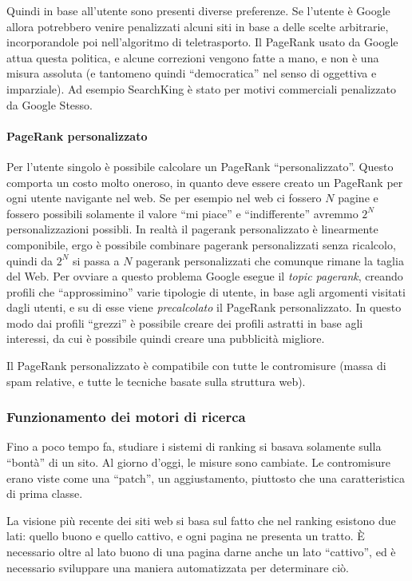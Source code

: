 Quindi in base all'utente sono presenti diverse preferenze. Se l'utente \`e Google allora potrebbero venire penalizzati alcuni siti in base a delle scelte arbitrarie, incorporandole poi nell'algoritmo di teletrasporto. Il PageRank usato da Google attua questa politica, e alcune correzioni vengono fatte a mano, e non \`e una misura assoluta (e tantomeno quindi ``democratica'' nel senso di oggettiva e imparziale). Ad esempio SearchKing \`e stato per motivi commerciali penalizzato da Google Stesso.

\paragraph*{PageRank personalizzato}Per l'utente singolo \`e possibile calcolare un PageRank ``personalizzato''. Questo comporta un costo molto oneroso, in quanto deve essere creato un PageRank per ogni utente navigante nel web. Se per esempio nel web ci fossero $N$ pagine e fossero possibili solamente il valore ``mi piace'' e ``indifferente'' avremmo $2^N $ personalizzazioni possibli. In realt\`a il pagerank personalizzato \`e linearmente componibile, ergo \`e possibile combinare pagerank personalizzati senza ricalcolo, quindi da $2^N $ si passa a $N$ pagerank personalizzati che comunque rimane la taglia del Web. Per ovviare a questo problema Google esegue il \textit{topic pagerank}, creando profili che ``approssimino'' varie tipologie di utente, in base agli argomenti visitati dagli utenti, e su di esse viene \textit{precalcolato} il PageRank personalizzato. In questo modo dai profili ``grezzi'' \`e possibile creare dei profili astratti in base agli interessi, da cui \`e possibile quindi creare una pubblicit\`a migliore.

Il PageRank personalizzato \`e compatibile con tutte le contromisure (massa di spam relative, e tutte le tecniche basate sulla struttura web).


\subsubsection{Funzionamento dei motori di ricerca}

Fino a poco tempo fa, studiare i sistemi di ranking si basava solamente sulla ``bont\`a'' di un sito. Al giorno d'oggi, le misure sono cambiate. Le contromisure erano viste come una ``patch'', un aggiustamento, piuttosto che una caratteristica di prima classe.

La visione pi\`u recente dei siti web si basa sul fatto che nel ranking esistono due lati: quello buono e quello cattivo, e ogni pagina ne presenta un tratto.
\`E necessario oltre al lato buono di una pagina darne anche un lato ``cattivo'', ed \`e necessario sviluppare una maniera automatizzata per determinare ci\`o.

